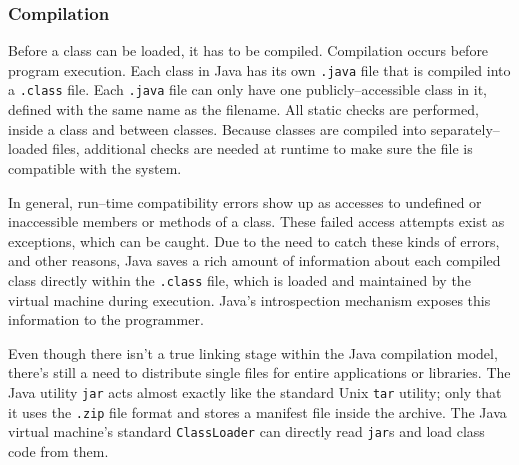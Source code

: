 \subsubsection{Compilation}

Before a class can be loaded, it has to be compiled. Compilation occurs before
program execution. Each class in Java has its own \texttt{.java} file that is
compiled into a \texttt{.class} file. Each \texttt{.java} file can only have
one publicly--accessible class in it, defined with the same name as the
filename. All static checks are performed, inside a class and between classes.
Because classes are compiled into separately--loaded files, additional checks
are needed at runtime to make sure the file is compatible with the system.

In general, run--time compatibility errors show up as accesses to undefined or
inaccessible members or methods of a class. These failed access attempts exist
as exceptions, which can be caught. Due to the need to catch these kinds of
errors, and other reasons, Java saves a rich amount of information about each
compiled class directly within the \texttt{.class} file, which is loaded and
maintained by the virtual machine during execution. Java's introspection
mechanism exposes this information to the programmer.

Even though there isn't a true linking stage within the Java compilation
model, there's still a need to distribute single files for entire applications
or libraries. The Java utility \texttt{jar} acts almost exactly like the
standard Unix \texttt{tar} utility; only that it uses the \texttt{.zip} file
format and stores a manifest file inside the archive. The Java virtual
machine's standard \texttt{ClassLoader} can directly read \texttt{jar}s and
load class code from them.


